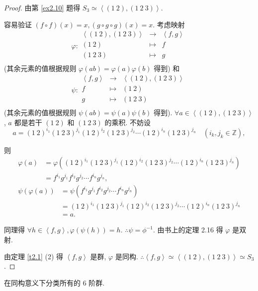 \documentclass[color=black,device=normal,lang=cn,mode=geye]{elegantnote}
\begin{document}
\begin{proof}
    由第 \ref{ex2.10} 题得 $S_3\simeq\left<(1\ 2),(1\ 2\ 3)\right>$.

    容易验证 $(f\circ f)(x)=x,(g\circ g\circ g)(x)=x$. 考虑映射
    \[\varphi:\begin{array}{rcl}
        \left<(1\ 2),(1\ 2\ 3)\right> & \to & \left<f,g\right> \\
        (1\ 2)    & \mapsto & f \\
        (1\ 2\ 3) & \mapsto & g \\
    \end{array}\]
    (其余元素的值根据规则 $\varphi(ab)=\varphi(a)\varphi(b)$ 得到) 和
    \[\psi:\begin{array}{rcl}
        \left<f,g\right> & \to & \left<(1\ 2),(1\ 2\ 3)\right> \\
        f & \mapsto & (1\ 2)    \\
        g & \mapsto & (1\ 2\ 3) \\
    \end{array}\]
    (其余元素的值根据规则 $\psi(ab)=\psi(a)\psi(b)$ 得到). $\forall a\in\left<(1\ 2),(1\ 2\ 3)\right>$, $a$ 都是若干 $(1\ 2)$ 和 $(1\ 2\ 3)$ 的乘积. 不妨设
    \[a=(1\ 2)^{i_1}(1\ 2\ 3)^{j_1}(1\ 2)^{i_2}(1\ 2\ 3)^{j_2}\cdots(1\ 2)^{i_n}(1\ 2\ 3)^{j_n}\quad(i_k,j_k\in\mathbb{Z}),\]

    则
    \begin{align*}
        \varphi(a) & =\varphi((1\ 2)^{i_1}(1\ 2\ 3)^{j_1}(1\ 2)^{i_2}(1\ 2\ 3)^{j_2}\cdots(1\ 2)^{i_n}(1\ 2\ 3)^{j_n}) \\
        & =f^{i_1}g^{j_1}f^{i_2}g^{j_2}\cdots f^{i_n}g^{j_n},
    \end{align*}
    \begin{align*}
        \psi(\varphi(a)) & =\psi(f^{i_1}g^{j_1}f^{i_2}g^{j_2}\cdots f^{i_n}g^{j_n}) \\
        & =(1\ 2)^{i_1}(1\ 2\ 3)^{j_1}(1\ 2)^{i_2}(1\ 2\ 3)^{j_2}\cdots(1\ 2)^{i_n}(1\ 2\ 3)^{j_n} \\
        & =a.
    \end{align*}
    
    同理得 $\forall h\in\left<f,g\right>,\varphi(\psi(h))=h$. $\therefore\psi=\phi^{-1}$. 由书上的定理 2.16 得 $\varphi$ 是双射.

    由定理 \ref{t2.1} (2) 得 $\left<f,g\right>$ 是群, $\varphi$ 是同构. $\therefore\left<f,g\right>\simeq\left<(1\ 2),(1\ 2\ 3)\right>\simeq S_3$.
\end{proof}
\begin{exercisec}[5.2.29]
    在同构意义下分类所有的 $6$ 阶群.
\end{exercisec}
\end{document}
